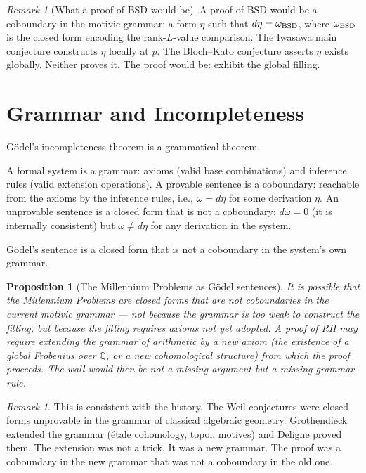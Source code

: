 \documentclass[12pt]{article}
\newtheorem{proposition}[theorem]{Proposition}
\theoremstyle{definition}
\theoremstyle{remark}
\newtheorem{remark}[theorem]{Remark}
\begin{document}
\begin{remark}[What a proof of BSD would be]
A proof of BSD would be a coboundary in the motivic grammar:
a form $\eta$ such that
$d\eta = \omega_{\rm BSD}$,
where $\omega_{\rm BSD}$ is the closed form encoding the rank-$L$-value
comparison.
The Iwasawa main conjecture \cite{iwasawa} constructs $\eta$ locally at $p$.
The Bloch--Kato conjecture \cite{blochkato} asserts $\eta$ exists globally.
Neither proves it.
The proof would be: exhibit the global filling.
\end{remark}

\section{Grammar and Incompleteness}

G\"odel's incompleteness theorem is a grammatical theorem.

A formal system is a grammar: axioms (valid base combinations)
and inference rules (valid extension operations).
A provable sentence is a coboundary: reachable from the axioms
by the inference rules, i.e., $\omega = d\eta$ for some derivation $\eta$.
An unprovable sentence is a closed form that is not a coboundary:
$d\omega = 0$ (it is internally consistent) but $\omega \neq d\eta$
for any derivation in the system.

G\"odel's sentence is a closed form that is not a coboundary
in the system's own grammar.

\begin{proposition}[The Millennium Problems as G\"odel sentences]
It is possible that the Millennium Problems are closed forms
that are not coboundaries in the current motivic grammar ---
not because the grammar is too weak to construct the filling,
but because the filling requires axioms not yet adopted.
A proof of RH may require extending the grammar of arithmetic
by a new axiom (the existence of a global Frobenius over $\mathbb{Q}$,
or a new cohomological structure) from which the proof proceeds.
The wall would then be not a missing argument
but a missing grammar rule.
\end{proposition}

\begin{remark}
This is consistent with the history.
The Weil conjectures were closed forms unprovable
in the grammar of classical algebraic geometry.
Grothendieck extended the grammar (\'etale cohomology, topoi, motives)
and Deligne proved them.
The extension was not a trick. It was a new grammar.
The proof was a coboundary in the new grammar
that was not a coboundary in the old one.
\end{remark}
\end{document}
